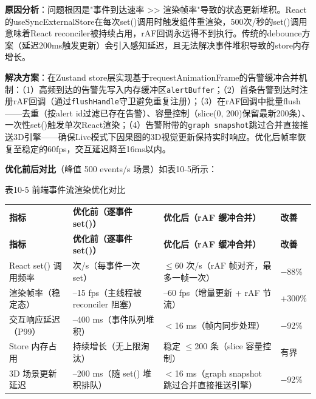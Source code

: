 \documentclass[a4paper]{ctexart}
\makeatletter
\renewcommand{\_}{%
  \ifmmode
    \nfss@text{\textunderscore}%
  \else
    \textunderscore\discretionary{}{}{}%
  \fi}
\makeatother
\begin{document}
\textbf{原因分析}：问题根因是"事件到达速率 >> 渲染帧率"导致的状态更新堆积。React的useSyncExternalStore在每次set()调用时触发组件重渲染，500次/秒的set()调用意味着React reconciler被持续占用，rAF回调永远得不到执行。传统的debounce方案（延迟200ms触发更新）会引入感知延迟，且无法解决事件堆积导致的store内存增长。

\textbf{解决方案}：在Zustand store层实现基于requestAnimationFrame的告警缓冲合并机制：（1）高频到达的告警先写入内存缓冲区\texttt{alertBuffer}；（2）首条告警到达时注册rAF回调（通过\texttt{flushHandle}守卫避免重复注册）；（3）在rAF回调中批量flush——去重（按alert\_id过滤已存在告警）、容量控制（slice(0, 200)保留最新200条）、一次性set()触发单次React渲染；（4）告警附带的\texttt{graph\_snapshot}跳过合并直接推送3D引擎——确保Live模式下因果图的3D视觉更新保持实时响应。优化后帧率恢复至稳定的60fps，交互延迟降至16ms以内。

\textbf{优化前后对比}（峰值 500 events/s 场景）如表10-5所示：



\medskip
{\centering\small
表10-5 前端事件流渲染优化对比\par
\vspace{3pt}
\setlength{\tabcolsep}{6pt}
\renewcommand{\arraystretch}{1.1}
\begin{longtable}{>{\raggedright\arraybackslash}p{3.3cm} >{\raggedright\arraybackslash}p{3.3cm} >{\raggedright\arraybackslash}p{3.3cm} >{\raggedright\arraybackslash}p{3.3cm}}
\hline
\textbf{指标} & \textbf{优化前（逐事件 set()）} & \textbf{优化后（rAF 缓冲合并）} & \textbf{改善} \\*
\hline
\endfirsthead
\hline
\textbf{指标} & \textbf{优化前（逐事件 set()）} & \textbf{优化后（rAF 缓冲合并）} & \textbf{改善} \\
\hline
\endhead
\hline
\endfoot
\hline
\endlastfoot
React set() 调用频率 & 500 次/s（每事件一次 set） & $\leq$60 次/s（rAF 帧对齐，最多一帧一次） & $-$88\% \\*
\hline
渲染帧率（稳定态） & 8--15 fps（主线程被 reconciler 阻塞） & 55--60 fps（增量更新 + rAF 节流） & +300\% \\*
\hline
交互响应延迟（P99） & 200--400 ms（事件队列堆积） & $<$16 ms（帧内同步处理） & $-$92\% \\*
\hline
Store 内存占用 & 持续增长（无上限淘汰） & 稳定 $\leq$200 条（slice 容量控制） & 有界 \\*
\hline
3D 场景更新延迟 & 100--200 ms（随 set() 堆积排队） & $<$16 ms（graph\_snapshot 跳过合并直接推送引擎） & $-$92\% \\
\hline
\end{longtable}
\par}
\end{document}
